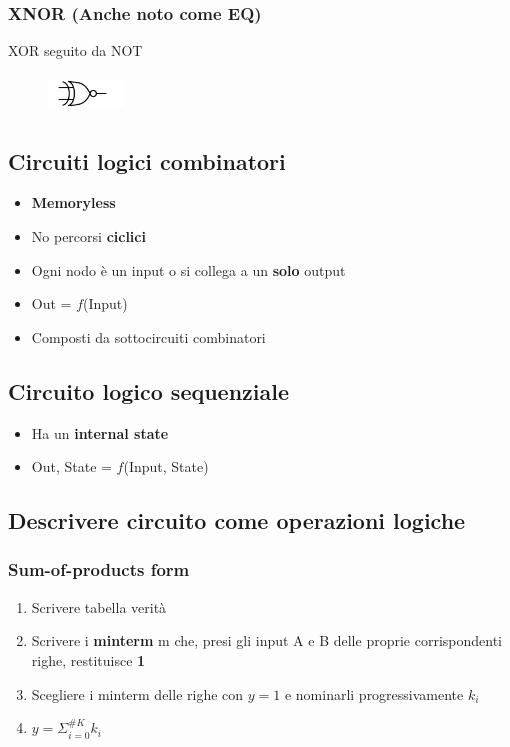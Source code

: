 \documentclass{report}
\begin{document}
        \subsubsection{XNOR (Anche noto come EQ)}
            XOR seguito da NOT
            \begin{center}
                \begin{figure}[H]
                    \includegraphics[width=2cm,height=1cm]{xnor.png}
                \end{figure}
            \end{center}
    \subsection{Circuiti logici combinatori}
    \begin{itemize}
        \item \textbf{Memoryless}
        \item No percorsi \textbf{ciclici}
        \item Ogni nodo è un input o si collega a un \textbf{solo} output
        \item Out = $f$(Input)
        \item Composti da sottocircuiti combinatori
    \end{itemize}
    \subsection{Circuito logico sequenziale}
    \begin{itemize}
        \item Ha un \textbf{internal state}
        \item Out, State = $f$(Input, State)
    \end{itemize}
    \subsection{Descrivere circuito come operazioni logiche}
        \subsubsection{Sum-of-products form}
        \begin{enumerate}
            \item Scrivere tabella verità
            \item Scrivere i \textbf{minterm} m che, presi gli input A e B delle
              proprie corrispondenti righe, restituisce \textbf{1}
            \item Scegliere i minterm delle righe con $y=1$ e nominarli progressivamente $k_i$
            \item $y = \Sigma_{i=0}^{\#K}k_i$
        \end{enumerate}
\end{document}
